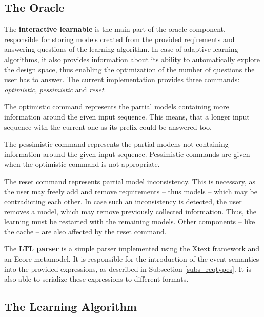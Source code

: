 \subsection{The Oracle} \label{subsec_oracleimpl}
The \textbf{interactive learnable} is the main part of the oracle component, responsible for storing models created from the provided reqirements and answering questions of the learning algorithm. In case of adaptive learning algorithms, it also provides information about its ability to automatically explore the design space, thus enabling the optimization of the number of questions the user has to answer. The current implementation provides three commands: \textit{optimistic}, \textit{pessimistic} and \textit{reset}.

The optimistic command represents the partial models containing more information around the given input sequence. This means, that a longer input sequence with the current one as its prefix could be answered too. 

The pessimistic command represents the partial modens not containing information around the given input sequence. Pessimistic commands are given when the optimistic command is not appropriate.

The reset command represents partial model inconsistency. This is necessary, as the user may freely add and remove requirements -- thus models -- which may be contradicting each other. In case such an inconsistency is detected, the user removes a model, which may remove previously collected information. Thus, the learning must be restarted with the remaining models. Other components -- like the cache -- are also affected by the reset command.

The \textbf{LTL parser} is a simple parser implemented using the Xtext framework and an Ecore metamodel. It is responsible for the introduction of the event semantics into the provided expressions, as described in Subsection \ref{subs_reqtypes}. It is also able to serialize these expressions to different formats.

\subsection{The Learning Algorithm} \label{subsec_adaptivedhc}

